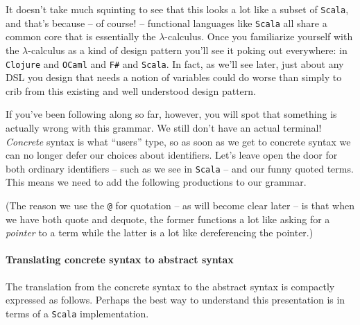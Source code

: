 
It doesn't take much squinting to see that this looks a lot like a
subset of \texttt{Scala}, and that's because -- of course! --
functional languages like \texttt{Scala} all share a common core that
is essentially the $\lambda$-calculus. Once you familiarize yourself
with the $\lambda$-calculus as a kind of design pattern you'll see it
poking out everywhere: in \texttt{Clojure} and \texttt{OCaml} and
\texttt{F\#} and \texttt{Scala}. In fact, as we'll see later, just
about any DSL you design that needs a notion of variables could do
worse than simply to crib from this existing and well understood
design pattern.

If you've been following along so far, however, you will spot that
something is actually wrong with this grammar. We still don't have an
actual terminal! \emph{Concrete} syntax is what ``users'' type, so as
soon as we get to concrete syntax we can no longer defer our choices
about identifiers. Let's leave open the door for both ordinary
identifiers -- such as we see in \texttt{Scala} -- and our funny
quoted terms. This means we need to add the following productions to
our grammar.


(The reason we use the \texttt{@} for quotation -- as will become
clear later -- is that when we have both quote and dequote, the former
functions a lot like asking for a \emph{pointer} to a term while the
latter is a lot like dereferencing the pointer.)

\paragraph{Translating concrete syntax to abstract syntax}
The translation from the concrete syntax to the abstract syntax is
compactly expressed as follows. Perhaps the best way to understand
this presentation is in terms of a \texttt{Scala} implementation.

